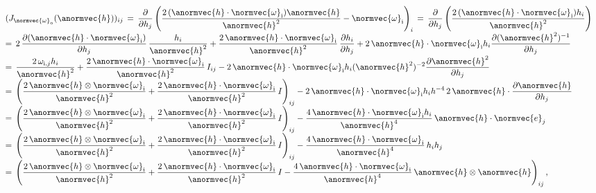 \begin{equation}
\renewcommand*{\arraystretch}{2}
\begin{array}{l}
\displaystyle (J_{\normvec{\omega}_{\text{o}}}(\anormvec{h}))_{ij} \,=\, \frac{\partial}{\partial h_{j}}\left(\frac{2\,(\anormvec{h}\cdot\normvec{\omega}_{\text{i}})\anormvec{h}}{\anormvec{h}^2} - \normvec{\omega}_{\text{i}}\right)_i  \,=\, \frac{\partial}{\partial h_{j}}\left(\frac{2\,(\anormvec{h}\cdot\normvec{\omega}_{\text{i}})h_i}{\anormvec{h}^2}\right) \\
\displaystyle =\, 2\,\frac{\partial(\anormvec{h}\cdot\normvec{\omega}_{\text{i}})}{\partial h_{j}}\,\frac{h_i}{\anormvec{h}^2} +
\frac{2\,\anormvec{h}\cdot\normvec{\omega}_{\text{i}}}{\anormvec{h}^2}\,\frac{\partial h_i}{\partial h_{j}} +
2\,\anormvec{h}\cdot\normvec{\omega}_{\text{i}}h_i\frac{\partial(\anormvec{h}^2)^{-1}}{\partial h_{j}} \\
\displaystyle =\, \frac{2\,\omega_{\text{i},j}h_i}{\anormvec{h}^2} +
\frac{2\,\anormvec{h}\cdot\normvec{\omega}_{\text{i}}}{\anormvec{h}^2}\,I_{ij} -
2\,\anormvec{h}\cdot\normvec{\omega}_{\text{i}}h_i(\anormvec{h}^2)^{-2} \frac{\partial\anormvec{h}^2}{\partial h_{j}} \\
\displaystyle =\, \left(
\frac{2\,\anormvec{h}\otimes\normvec{\omega}_{\text{i}}}{\anormvec{h}^2} +
\frac{2\,\anormvec{h}\cdot\normvec{\omega}_{\text{i}}}{\anormvec{h}^2}\,I\right)_{ij} -
2\,\anormvec{h}\cdot\normvec{\omega}_{\text{i}}h_i h^{-4}\,2\,\anormvec{h}\cdot\frac{\partial\anormvec{h}}{\partial h_{j}} \\
\displaystyle =\, \left(
\frac{2\,\anormvec{h}\otimes\normvec{\omega}_{\text{i}}}{\anormvec{h}^2} +
\frac{2\,\anormvec{h}\cdot\normvec{\omega}_{\text{i}}}{\anormvec{h}^2}\,I\right)_{ij} -
\frac{4\,\anormvec{h}\cdot\normvec{\omega}_{\text{i}}h_i}{\anormvec{h}^4}\,\anormvec{h}\cdot\normvec{e}_j \\
\displaystyle =\, \left(
\frac{2\,\anormvec{h}\otimes\normvec{\omega}_{\text{i}}}{\anormvec{h}^2} +
\frac{2\,\anormvec{h}\cdot\normvec{\omega}_{\text{i}}}{\anormvec{h}^2}\,I\right)_{ij} -
\frac{4\,\anormvec{h}\cdot\normvec{\omega}_{\text{i}}}{\anormvec{h}^4}\,h_i h_j \\
\displaystyle =\, \left(
\frac{2\,\anormvec{h}\otimes\normvec{\omega}_{\text{i}}}{\anormvec{h}^2} +
\frac{2\,\anormvec{h}\cdot\normvec{\omega}_{\text{i}}}{\anormvec{h}^2}\,I -
\frac{4\,\anormvec{h}\cdot\normvec{\omega}_{\text{i}}}{\anormvec{h}^4}\,\anormvec{h}\otimes\anormvec{h}\right)_{ij},
\end{array}
\end{equation}

